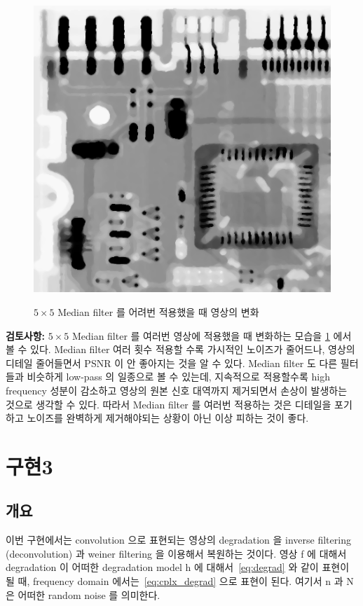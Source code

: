 \documentclass[a4paper, 12p]{paper}
\begin{document}
\begin{figure}[H]
{\includegraphics[scale=0.17]{../data/median_fourth.png}
}
\caption{$5 \times 5$ Median filter 를 어려번 적용했을 때 영상의 변화}\label{fig:median_many}
\end{figure}

\noindent\textbf{검토사항:} $5 \times 5$ Median filter 를 여러번 영상에 적용했을 때 변화하는 모습을 \ref{fig:median_many} 에서 볼 수 있다. Median filter 여러 횟수 적용할 수록 가시적인 노이즈가 줄어드나, 영상의 디테일 줄어들면서 PSNR 이 안 좋아지는 것을 알 수 있다. Median filter 도 다른 필터들과 비슷하게 low-pass 의 일종으로 볼 수 있는데, 지속적으로 적용할수록 high frequency 성분이 감소하고 영상의 원본 신호 대역까지 제거되면서 손상이 발생하는 것으로 생각할 수 있다. 따라서 Median filter 를 여러번 적용하는 것은 디테일을 포기하고 노이즈를 완벽하게 제거해야되는 상황이 아닌 이상 피하는 것이 좋다.

\section{구현3}
\subsection{개요}

이번 구현에서는 convolution 으로 표현되는 영상의 degradation 을 inverse filtering (deconvolution) 과 weiner filtering 을 이용해서 복원하는 것이다. 영상 f 에 대해서 degradation 이 어떠한 degradation model h 에 대해서~\eqref{eq:degrad} 와 같이 표현이 될 때, frequency domain 에서는~\eqref{eq:cplx_degrad} 으로 표현이 된다. 여기서 n 과 N 은 어떠한 random noise 를 의미한다.
\end{document}
